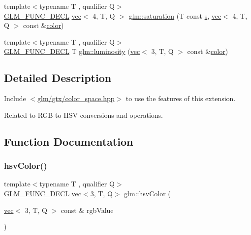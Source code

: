 \begin{DoxyCompactItemize}
\item 
{\footnotesize template$<$typename T , qualifier Q$>$ }\\\hyperlink{setup_8hpp_ab2d052de21a70539923e9bcbf6e83a51}{G\+L\+M\+\_\+\+F\+U\+N\+C\+\_\+\+D\+E\+CL} \hyperlink{structglm_1_1vec}{vec}$<$ 4, T, Q $>$ \hyperlink{group__gtx__color__space_gaba0eacee0736dae860e9371cc1ae4785}{glm\+::saturation} (T const \hyperlink{_s_d_l__opengl_8h_a4af680a6c683f88ed67b76f207f2e6e4}{s}, \hyperlink{structglm_1_1vec}{vec}$<$ 4, T, Q $>$ const \&\hyperlink{_s_d_l__opengl__glext_8h_a3ea846f998d64f079b86052b6c4193a8}{color})
\item 
{\footnotesize template$<$typename T , qualifier Q$>$ }\\\hyperlink{setup_8hpp_ab2d052de21a70539923e9bcbf6e83a51}{G\+L\+M\+\_\+\+F\+U\+N\+C\+\_\+\+D\+E\+CL} T \hyperlink{group__gtx__color__space_gad028e0a4f1a9c812b39439b746295b34}{glm\+::luminosity} (\hyperlink{structglm_1_1vec}{vec}$<$ 3, T, Q $>$ const \&\hyperlink{_s_d_l__opengl__glext_8h_a3ea846f998d64f079b86052b6c4193a8}{color})
\end{DoxyCompactItemize}


\subsection{Detailed Description}
Include $<$\hyperlink{gtx_2color__space_8hpp}{glm/gtx/color\+\_\+space.\+hpp}$>$ to use the features of this extension.

Related to R\+GB to H\+SV conversions and operations. 

\subsection{Function Documentation}
\mbox{\label{group__gtx__color__space_ga789802bec2d4fe0f9741c731b4a8a7d8}} 
\subsubsection{\texorpdfstring{hsv\+Color()}{hsvColor()}}
{\footnotesize\ttfamily template$<$typename T , qualifier Q$>$ \\
\hyperlink{setup_8hpp_ab2d052de21a70539923e9bcbf6e83a51}{G\+L\+M\+\_\+\+F\+U\+N\+C\+\_\+\+D\+E\+CL} \hyperlink{structglm_1_1vec}{vec}$<$3, T, Q$>$ glm\+::hsv\+Color (\begin{DoxyParamCaption}\item[{\hyperlink{structglm_1_1vec}{vec}$<$ 3, T, Q $>$ const \&}]{rgb\+Value }\end{DoxyParamCaption})}

